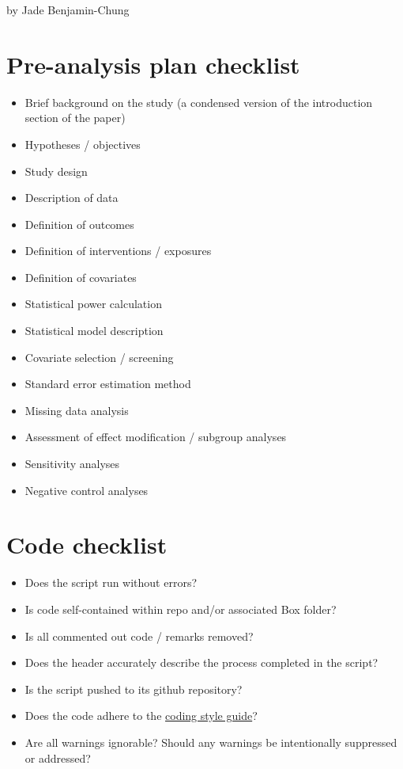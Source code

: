 \documentclass[
]{book}
\providecommand{\tightlist}{%
  \setlength{\itemsep}{0pt}\setlength{\parskip}{0pt}}
\begin{document}
by Jade Benjamin-Chung

\hypertarget{pre-analysis-plan-checklist}{%
\section{Pre-analysis plan checklist}\label{pre-analysis-plan-checklist}}

\begin{itemize}
\tightlist
\item
  Brief background on the study (a condensed version of the introduction section of the paper)
\item
  Hypotheses / objectives
\item
  Study design
\item
  Description of data
\item
  Definition of outcomes
\item
  Definition of interventions / exposures
\item
  Definition of covariates
\item
  Statistical power calculation
\item
  Statistical model description
\item
  Covariate selection / screening
\item
  Standard error estimation method
\item
  Missing data analysis
\item
  Assessment of effect modification / subgroup analyses
\item
  Sensitivity analyses
\item
  Negative control analyses
\end{itemize}

\hypertarget{code-checklist}{%
\section{Code checklist}\label{code-checklist}}

\begin{itemize}
\tightlist
\item
  Does the script run without errors?
\item
  Is code self-contained within repo and/or associated Box folder?
\item
  Is all commented out code / remarks removed?
\item
  Does the header accurately describe the process completed in the script?
\item
  Is the script pushed to its github repository?
\item
  Does the code adhere to the \href{https://jadebc.github.io/lab-manual/coding-style.html}{coding style guide}?
\item
  Are all warnings ignorable? Should any warnings be intentionally suppressed or addressed?
\end{itemize}
\end{document}
